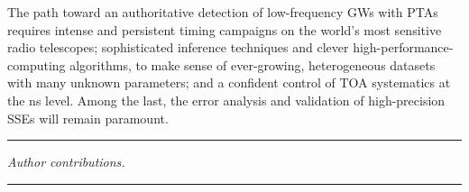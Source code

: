 \documentclass{aastex63}
\begin{document}
The path toward an authoritative detection of low-frequency GWs with PTAs requires intense and persistent timing campaigns on the world's most sensitive radio telescopes; 
sophisticated inference techniques and clever high-performance-computing algorithms, to make sense of ever-growing, heterogeneous datasets with many unknown parameters; and a confident control of TOA systematics at the ns level. Among the last, the error analysis and validation of high-precision SSEs will remain paramount.

\begin{center}
\rule{0.25\columnwidth}{.4pt}
\end{center}

\emph{Author contributions.} 
\\



\begin{center}
\rule{0.25\columnwidth}{.4pt}
\end{center}



{}



\end{document}
